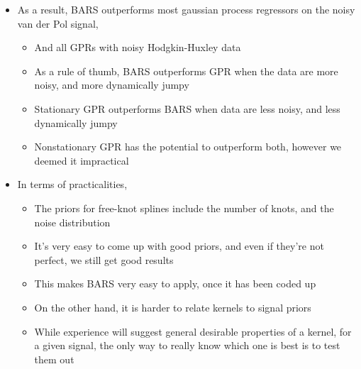 \documentclass[11pt]{article}
\begin{document}
\begin{itemize}
\item As a result, BARS outperforms most gaussian process regressors on the noisy van der Pol signal,
\begin{itemize}
\item And all GPRs with noisy Hodgkin-Huxley data
\item As a rule of thumb, BARS outperforms GPR when the data are more noisy, and more dynamically jumpy
\item Stationary GPR outperforms BARS when data are less noisy, and less dynamically jumpy
\item Nonstationary GPR has the potential to outperform both, however we deemed it impractical
\end{itemize}

\item In terms of practicalities,
\begin{itemize}
\item The priors for free-knot splines include the number of knots, and the noise distribution
\item It's very easy to come up with good priors, and even if they're not perfect, we still get good results
\item This makes BARS very easy to apply, once it has been coded up
\item On the other hand, it is harder to relate kernels to signal priors
\item While experience will suggest general desirable properties of a kernel, for a given signal, the only way to really know which one is best is to test them out
\end{itemize}
\end{itemize}
\end{document}
